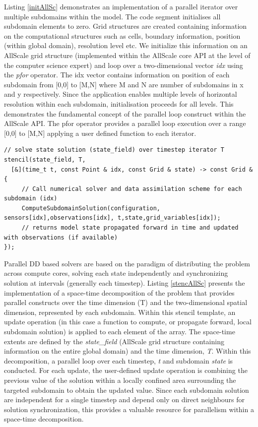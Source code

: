 \documentclass[conference,compsoc]{IEEEtran}
\begin{document}
Listing \ref{initAllSc} demonstrates an implementation of a parallel iterator over multiple subdomains within the model. The code segment initialises all subdomain elements to zero. Grid structures are created containing information on the computational structures such as cells, boundary information, position (within global domain), resolution level etc. We initialize this information on an AllScale grid structure (implemented within the AllScale core API at the level of the computer science expert) and loop over a two-dimensional vector \textit{idx} using the \textit{pfor} operator. The idx vector contains information on position of each subdomain from [0,0] to [M,N] where M and N are number of subdomains in x and y respectively. Since the application enables multiple levels of horizontal resolution within each subdomain, initialisation proceeds for all levels. This demonstrates the fundamental concept of the parallel loop construct within the AllScale API. The pfor operator provides a parallel loop execution over a range [0,0] to [M,N] applying a user defined function to each iterator.

\begin{lstlisting}[caption=AllScale Stencil parallel computation, label=stencAllSc]
// solve state solution (state_field) over timestep iterator T
stencil(state_field, T,
  [&](time_t t, const Point & idx, const Grid & state) -> const Grid & {
     // Call numerical solver and data assimilation scheme for each subdomain (idx)
     ComputeSubdomainSolution(configuration, sensors[idx],observations[idx], t,state,grid_variables[idx]);
     // returns model state propagated forward in time and updated with observations (if available)
});
\end{lstlisting}


Parallel DD based solvers are based on the paradigm of distributing the problem across compute cores, solving each state independently and synchronizing solution at intervals (generally each timestep). Listing \ref{stencAllSc} presents the implementation of a space-time decomposition of the problem that provides parallel constructs over the time dimension (T) and the two-dimensional spatial dimension, represented by each subdomain. Within this stencil template, an update operation (in this case a function to compute, or propagate forward, local subdomain solution) is applied to each element of the array. The space-time extents are defined by the \textit{state\_field} (AllScale grid structure containing information on the entire global domain) and the time dimension, \textit{T}. Within this decomposition, a parallel loop over each timestep, \textit{t} and subdomain \textit{state} is conducted. For each update, the user-defined update operation is combining the previous value of the solution within a locally confined area surrounding the targeted subdomain to obtain the updated value. Since each subdomain solution are independent for a single timestep and depend only on direct neighbours for solution synchronization, this provides a valuable resource for parallelism within a space-time decomposition. 
\end{document}
